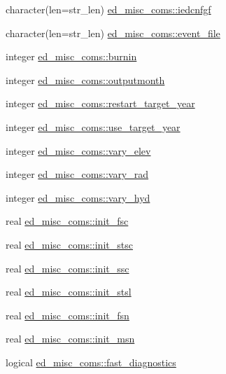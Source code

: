 \begin{DoxyCompactItemize}
\item 
character(len=str\+\_\+len) \hyperlink{namespaceed__misc__coms_af3a616393e9f54c5d4f173675475e3bf}{ed\+\_\+misc\+\_\+coms\+::iedcnfgf}
\item 
character(len=str\+\_\+len) \hyperlink{namespaceed__misc__coms_ab72c19aca546884ef6b4a1b38aa52500}{ed\+\_\+misc\+\_\+coms\+::event\+\_\+file}
\item 
integer \hyperlink{namespaceed__misc__coms_a9b554bb456be251df521579a073ec34d}{ed\+\_\+misc\+\_\+coms\+::burnin}
\item 
integer \hyperlink{namespaceed__misc__coms_a748c85614a28e87c39dc53fa6ab1b9a0}{ed\+\_\+misc\+\_\+coms\+::outputmonth}
\item 
integer \hyperlink{namespaceed__misc__coms_ad370e6ac01b25fa7a3e25026a738f75a}{ed\+\_\+misc\+\_\+coms\+::restart\+\_\+target\+\_\+year}
\item 
integer \hyperlink{namespaceed__misc__coms_ae4a76d724faf120b2006204ff0ef23c1}{ed\+\_\+misc\+\_\+coms\+::use\+\_\+target\+\_\+year}
\item 
integer \hyperlink{namespaceed__misc__coms_ab21ac81aaca643770273c9cd7459fdf4}{ed\+\_\+misc\+\_\+coms\+::vary\+\_\+elev}
\item 
integer \hyperlink{namespaceed__misc__coms_a27e42c090b331a3e77fe6dc919f92ef9}{ed\+\_\+misc\+\_\+coms\+::vary\+\_\+rad}
\item 
integer \hyperlink{namespaceed__misc__coms_aeaa438f9adddfed7efc7723a54a0c4c1}{ed\+\_\+misc\+\_\+coms\+::vary\+\_\+hyd}
\item 
real \hyperlink{namespaceed__misc__coms_a33e58e5288ad2fa889ed0de0fcdef094}{ed\+\_\+misc\+\_\+coms\+::init\+\_\+fsc}
\item 
real \hyperlink{namespaceed__misc__coms_affd94ce76afe2ead9503ecc470cf57de}{ed\+\_\+misc\+\_\+coms\+::init\+\_\+stsc}
\item 
real \hyperlink{namespaceed__misc__coms_a543b6b3e043f146ae1f4f4b304ff17f3}{ed\+\_\+misc\+\_\+coms\+::init\+\_\+ssc}
\item 
real \hyperlink{namespaceed__misc__coms_a6ce016d3998f978606f35bc3671ca744}{ed\+\_\+misc\+\_\+coms\+::init\+\_\+stsl}
\item 
real \hyperlink{namespaceed__misc__coms_a9ee49c841b107680ad86ba9c04a768b0}{ed\+\_\+misc\+\_\+coms\+::init\+\_\+fsn}
\item 
real \hyperlink{namespaceed__misc__coms_af130adee8fc32b35d48f85e53e4fa5d1}{ed\+\_\+misc\+\_\+coms\+::init\+\_\+msn}
\item 
logical \hyperlink{namespaceed__misc__coms_a6129d62392dbee90f1cec41a4b29395b}{ed\+\_\+misc\+\_\+coms\+::fast\+\_\+diagnostics}

\end{DoxyCompactItemize}
